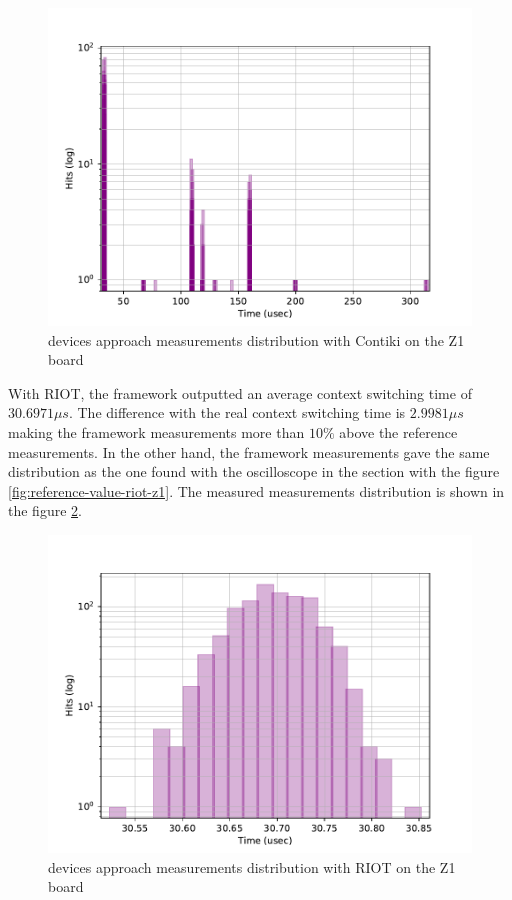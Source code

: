 \begin{figure}[!ht]
      \centering
      \includegraphics[scale=.7]{assets/devices-framework-contiki-z1.pdf}
      \caption{devices approach measurements distribution with Contiki on the Z1 board\label{fig:devices-framework-contiki-z1}}
\end{figure}

With RIOT, the framework outputted an average context switching time of $30.6971\mu s$.
The difference with the real context switching time is $2.9981\mu s$ making the framework measurements more than $10\%$ above the reference measurements.
In the other hand, the framework measurements gave the same distribution as the one found with the oscilloscope in the section \label{sec:ref-measurements} with the figure \ref{fig:reference-value-riot-z1}.
The measured measurements distribution is shown in the figure \ref{fig:devices-framework-riot-z1}.

\begin{figure}[!ht]
      \centering
      \includegraphics[scale=.7]{assets/devices-framework-riot-z1.pdf}
      \caption{devices approach measurements distribution with RIOT on the Z1 board\label{fig:devices-framework-riot-z1}}
\end{figure}

